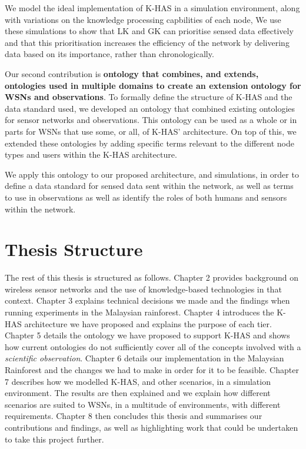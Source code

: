 We model the ideal implementation of K-HAS in a simulation environment, along with variations on the knowledge processing capbilities of each node, We use these simulations to show that LK and GK can prioritise sensed data effectively and that this prioritisation increases the efficiency of the network by delivering data based on its importance, rather than chronologically.

Our second contribution is \DIFdelbegin {}\DIFdelend \DIFaddbegin {}\DIFaddend \textbf{ontology that combines, and extends, ontologies used in multiple domains to create an extension ontology for WSNs and \DIFdelbegin {}\DIFdelend \DIFaddbegin {}\DIFaddend observations}. To formally define the structure of K-HAS and the data standard used, we developed an ontology that combined existing ontologies for sensor networks and \DIFdelbegin {}\DIFdelend \DIFaddbegin {}\DIFaddend observations. This \DIFdelbegin {}\DIFdelend ontology can be used as a whole or in parts for WSNs that use some, or all, of K-HAS' architecture. On top of this, we extended these ontologies by adding specific terms relevant to the different node types and users within the K-HAS architecture\DIFdelbegin {}\DIFdelend .

We apply this ontology to our proposed architecture, and simulations, in order to define a data standard for sensed data sent within the network, as well as terms to use in observations as well as identify the roles of both humans and sensors within the network.


\section{Thesis Structure}
The rest of this thesis is structured as follows. Chapter 2 provides background on wireless sensor networks and the use of knowledge-based technologies in that context. Chapter 3 explains technical decisions we made and the findings when running experiments in the Malaysian rainforest. Chapter 4 introduces the K-HAS architecture we have proposed and explains the purpose of each tier. Chapter 5 details the ontology we have proposed to support K-HAS and shows how current ontologies do not sufficiently cover all of the concepts involved with a \textit{scientific observation}. Chapter 6 details our implementation in the Malaysian Rainforest and the changes we had to make in order for it to be feasible. Chapter 7 describes how we modelled K-HAS, and other scenarios, in a simulation environment. The results are then explained and we explain how different scenarios are suited to WSNs, in a multitude of environments, with different requirements. Chapter 8 then concludes this thesis and summarises our contributions and findings, as well as highlighting work that could be undertaken to take this project further.
